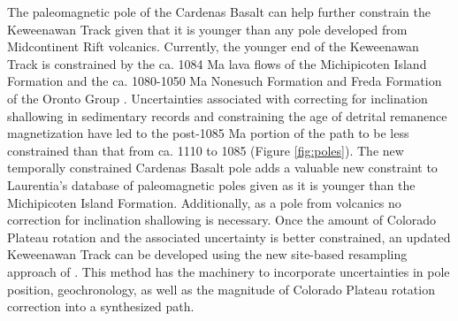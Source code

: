 \documentclass[draft]{agujournal2019}
\begin{document}
The paleomagnetic pole of the Cardenas Basalt can help further constrain the Keweenawan Track given that it is younger than any pole developed from Midcontinent Rift volcanics. Currently, the younger end of the Keweenawan Track is constrained by the ca. 1084 Ma lava flows of the Michipicoten Island Formation and the ca. 1080-1050 Ma Nonesuch Formation and Freda Formation of the Oronto Group \cite{Swanson-Hysell2019a}. Uncertainties associated with correcting for inclination shallowing in sedimentary records and constraining the age of detrital remanence magnetization have led to the post-1085 Ma portion of the path to be less constrained than that from ca. 1110 to 1085 (Figure \ref{fig:poles}). The new temporally constrained Cardenas Basalt pole adds a valuable new constraint to Laurentia's database of paleomagnetic poles given as it is younger than the Michipicoten Island Formation. Additionally, as a pole from volcanics no correction for inclination shallowing is necessary. Once the amount of Colorado Plateau rotation and the associated uncertainty is better constrained, an updated Keweenawan Track can be developed using the new site-based resampling approach of . This method has the machinery to incorporate uncertainties in pole position, geochronology, as well as the magnitude of Colorado Plateau rotation correction into a synthesized path.


\end{document}
